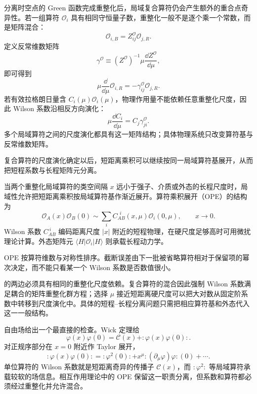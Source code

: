 分离时空点的 Green 函数完成重整化后，局域复合算符仍会产生额外的重合点奇异性。若一组算符 $\mathcal O_i$ 具有相同守恒量子数，重整化一般不是逐个乘一个常数，而是矩阵混合：
\begin{equation}
 \boxed{\mathcal O_{i,B}=Z_{ij}^{\mathcal O}\mathcal O_{j,R}.}
 \label{eq:composite-operator-mixing-dp11}
\end{equation}
定义反常维数矩阵
\begin{equation*}
 \gamma^{\mathcal O}
 \equiv (Z^{\mathcal O})^{-1}\mu\frac{\dd Z^{\mathcal O}}{\dd\mu},
\end{equation*}
即可得到
\begin{equation*}
 \mu\frac{\dd}{\dd\mu}\mathcal O_{i,R}
 =-\gamma_{ij}^{\mathcal O}\mathcal O_{j,R}.
\end{equation*}
若有效拉格朗日量含 $C_i(\mu)\mathcal O_i(\mu)$，物理作用量不能依赖任意重整化尺度，因此 Wilson 系数沿相反方向演化：
\begin{equation}
 \boxed{
 \mu\frac{\dd C_i}{\dd\mu}
 =C_j\gamma_{ji}^{\mathcal O}.}
 \label{eq:wilson-rg-dp11}
\end{equation}
多个局域算符之间的尺度演化都具有这一矩阵结构；具体物理系统只改变算符基与反常维数矩阵。

复合算符的尺度演化确定以后，短距离乘积可以继续按同一局域算符基展开，从而把短程系数与长程矩阵元分离。

当两个重整化局域算符的类空间隔 $x$ 远小于强子、介质或外态的长程尺度时，局域性允许把短距离乘积按局域算符基作渐近展开。算符乘积展开（OPE）的结构为
\begin{equation}
 \boxed{
 \mathcal O_A(x)\mathcal O_B(0)
 \sim\sum_i C_{AB}^{\ \ i}(x,\mu)\mathcal O_i(0,\mu),
 \qquad x\to0.}
 \label{eq:ope-general-dp11}
\end{equation}
Wilson 系数 $C_{AB}^{\ i}$ 编码距离尺度 $|x|$ 附近的短程物理，在硬尺度足够高时可用微扰理论计算。外态矩阵元 $\langle H|\mathcal O_i|H\rangle$ 则承载长程动力学。

OPE 按算符维数与对称性排序。截断误差由下一批被省略算符相对于保留项的幂次决定，而不能只看某一个 Wilson 系数是否数值很小。

 的两边必须具有相同的重整化尺度依赖。复合算符的混合因此强制 Wilson 系数满足耦合的矩阵重整化群方程；选择 $\mu$ 接近短距离硬尺度可以把大对数从固定阶系数中转移到尺度演化中。具体的短程--长程分离问题只需把相应算符基和外态代入这一一般结构。

自由场给出一个最直接的检查。Wick 定理给
\begin{equation*}
 \varphi(x)\varphi(0)
 =\mathcal C(x)+:\!\varphi(x)\varphi(0)\!:.
\end{equation*}
对正规序部分在 $x=0$ 附近作 Taylor 展开，
\begin{equation*}
 :\!\varphi(x)\varphi(0)\!:
 =:\!\varphi^2(0)\!:
 +x^\mu:\!(\partial_\mu\varphi)\varphi\!:(0)+\cdots.
\end{equation*}
单位算符的 Wilson 系数就是短距离奇异的传播子 $\mathcal C(x)$，而 $:\!\varphi^2\!:$ 等局域算符承载较软的场信息。相互作用理论中的 OPE 保留这一职责分离，但系数和算符都必须经过重整化并允许混合。

